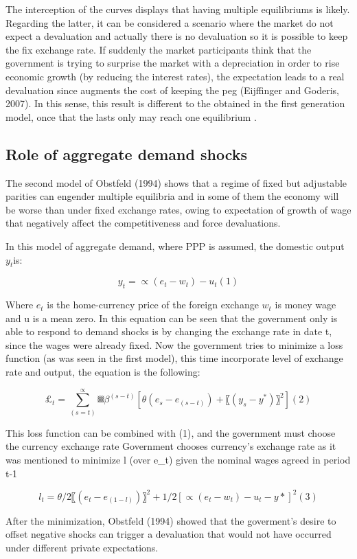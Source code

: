 \documentclass[a4paper,12pt]{article}
\begin{document}
The interception of the curves displays that having multiple equilibriums is likely. Regarding the latter, it can be considered a scenario where the market do not expect a devaluation and actually there is no devaluation so it is possible to keep the fix exchange rate. If suddenly the market participants think that the government is trying to surprise the market with a depreciation in order to rise economic growth (by reducing the interest rates), the expectation leads to a real devaluation since augments the cost of keeping the peg (Eijffinger and Goderis, 2007).  In this sense, this result is different to the obtained in the first generation model, once that the lasts only may reach one equilibrium . 

\subsection{Role of aggregate demand shocks} 
The second model of Obstfeld (1994) shows that a regime of fixed but adjustable parities can engender multiple equilibria and in some of them the economy will be worse than under fixed exchange rates, owing to expectation of growth of wage that negatively affect the competitiveness and force devaluations. 

In this model of aggregate demand, where PPP is assumed, the domestic output $y_t$is:

$$y_t= ∝(e_t-w_t )- u_t       (1)$$

Where $e_t$ is the home-currency price of the foreign exchange $w_t$ is money wage and u is a mean zero. In this equation can be seen that the government only is able to respond to demand shocks is by changing the exchange rate in date t, since the wages were already fixed. Now the government tries to minimize a loss function (as was seen in the first model), this time incorporate level of exchange rate and output, the equation is the following:

$$£_t=∑_(s=t)^∝▒β^(s-t)  [θ(e_s-e_(s-t) )+〖(y_s-y^*)〗^2 ]       (2)$$

This loss function can be combined with (1), and the government must choose the currency exchange rate Government chooses currency's exchange rate as it was mentioned to minimize l (over e_t) given the nominal wages agreed in period t-1


$$l_t=  θ/2 〖(e_t-e_(1-l))〗^2+1/2 [∝(e_t-w_t )- u_t-y*]^2     (3)$$

After the minimization, Obstfeld (1994) showed that the goverment's desire to offset negative shocks can trigger a devaluation that would not have occurred under different private expectations. 
\end{document}
